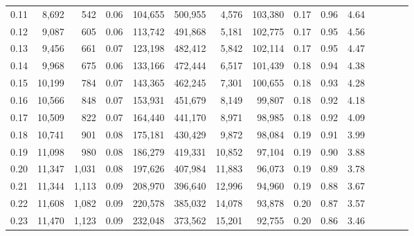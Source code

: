 \begin{tabular}{rrrcrrrrrrrrrrr}
0.11 &   8,692 &    542 &                                       0.06 &  104,655 &  500,955 &    4,576 &  103,380 &  0.17 &  0.96 &                         4.64 \\
0.12 &   9,087 &    605 &                                       0.06 &  113,742 &  491,868 &    5,181 &  102,775 &  0.17 &  0.95 &                         4.56 \\
0.13 &   9,456 &    661 &                                       0.07 &  123,198 &  482,412 &    5,842 &  102,114 &  0.17 &  0.95 &                         4.47 \\
0.14 &   9,968 &    675 &                                       0.06 &  133,166 &  472,444 &    6,517 &  101,439 &  0.18 &  0.94 &                         4.38 \\
0.15 &  10,199 &    784 &                                       0.07 &  143,365 &  462,245 &    7,301 &  100,655 &  0.18 &  0.93 &                         4.28 \\
0.16 &  10,566 &    848 &                                       0.07 &  153,931 &  451,679 &    8,149 &   99,807 &  0.18 &  0.92 &                         4.18 \\
0.17 &  10,509 &    822 &                                       0.07 &  164,440 &  441,170 &    8,971 &   98,985 &  0.18 &  0.92 &                         4.09 \\
0.18 &  10,741 &    901 &                                       0.08 &  175,181 &  430,429 &    9,872 &   98,084 &  0.19 &  0.91 &                         3.99 \\
0.19 &  11,098 &    980 &                                       0.08 &  186,279 &  419,331 &   10,852 &   97,104 &  0.19 &  0.90 &                         3.88 \\
0.20 &  11,347 &  1,031 &                                       0.08 &  197,626 &  407,984 &   11,883 &   96,073 &  0.19 &  0.89 &                         3.78 \\
0.21 &  11,344 &  1,113 &                                       0.09 &  208,970 &  396,640 &   12,996 &   94,960 &  0.19 &  0.88 &                         3.67 \\
0.22 &  11,608 &  1,082 &                                       0.09 &  220,578 &  385,032 &   14,078 &   93,878 &  0.20 &  0.87 &                         3.57 \\
0.23 &  11,470 &  1,123 &                                       0.09 &  232,048 &  373,562 &   15,201 &   92,755 &  0.20 &  0.86 &                         3.46 \\

\end{tabular}
